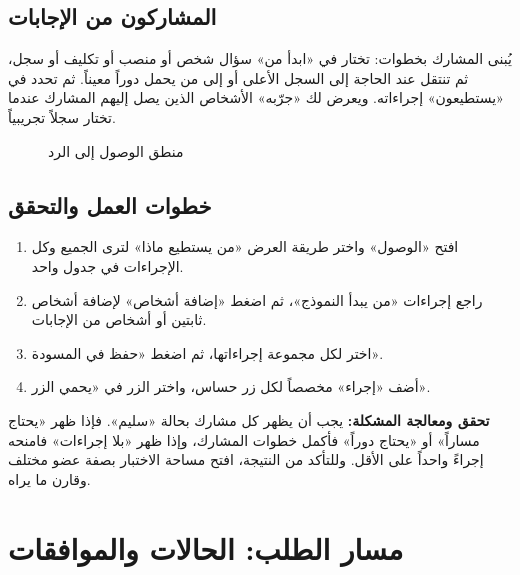 \subsection{المشاركون من الإجابات}
يُبنى المشارك بخطوات: تختار في «ابدأ من» سؤال شخص أو منصب أو تكليف أو سجل، ثم تنتقل عند الحاجة إلى السجل الأعلى أو إلى من يحمل دوراً معيناً. ثم تحدد في «يستطيعون» إجراءاته. ويعرض لك «جرّبه» الأشخاص الذين يصل إليهم المشارك عندما تختار سجلاً تجريبياً.

\begin{figure}[H]
\centering
{}
\rclegend
\caption{منطق الوصول إلى الرد}
\label{fig:builder-forms-access-flow}
\end{figure}

\subsection{خطوات العمل والتحقق}
\begin{enumerate}
\item افتح «الوصول» واختر طريقة العرض «من يستطيع ماذا» لترى الجميع وكل الإجراءات في جدول واحد.
\item راجع إجراءات «من يبدأ النموذج»، ثم اضغط «إضافة أشخاص» لإضافة أشخاص ثابتين أو أشخاص من الإجابات.
\item اختر لكل مجموعة إجراءاتها، ثم اضغط «حفظ في المسودة».
\item أضف «إجراء» مخصصاً لكل زر حساس، واختر الزر في «يحمي الزر».
\end{enumerate}

\textbf{تحقق ومعالجة المشكلة:} يجب أن يظهر كل مشارك بحالة «سليم». فإذا ظهر «يحتاج مساراً» أو «يحتاج دوراً» فأكمل خطوات المشارك، وإذا ظهر «بلا إجراءات» فامنحه إجراءً واحداً على الأقل. وللتأكد من النتيجة، افتح مساحة الاختبار بصفة عضو مختلف وقارن ما يراه.

\clearpage
\section{مسار الطلب: الحالات والموافقات}
\label{sec:builder-feature-forms-journey}

